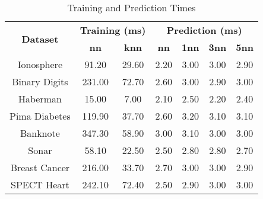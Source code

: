 \begin{table}[htbp]
\caption{Training and Prediction Times}
\begin{center}
\begin{tabular}{|c|c|c|c|c|c|c|}
\hline
\multirow{2}{*}{\textbf{Dataset}} & \multicolumn{2}{c|}{\textbf{Training (ms)}} & \multicolumn{4}{c|}{\textbf{Prediction (ms)}} \\ \cline{2-7}
 & \textbf{nn} & \textbf{knn} & \textbf{nn} & \textbf{1nn} & \textbf{3nn} & \textbf{5nn} \\ \hline
Ionosphere & 91.20 & 29.60 & 2.20 & 3.00 & 3.00 & 2.90 \\ \hline
Binary Digits & 231.00 & 72.70 & 2.60 & 3.00 & 2.90 & 3.00 \\ \hline
Haberman & 15.00 & 7.00 & 2.10 & 2.50 & 2.20 & 2.40 \\ \hline
Pima Diabetes & 119.90 & 37.70 & 2.60 & 3.20 & 3.10 & 3.10 \\ \hline
Banknote & 347.30 & 58.90 & 3.00 & 3.10 & 3.00 & 3.00 \\ \hline
Sonar & 58.10 & 22.50 & 2.50 & 2.80 & 2.80 & 2.70 \\ \hline
Breast Cancer & 216.00 & 33.70 & 2.70 & 3.00 & 3.00 & 2.90 \\ \hline
SPECT Heart & 242.10 & 72.40 & 2.50 & 2.90 & 3.00 & 3.00 \\ \hline
\end{tabular}
\label{tab:timing}
\end{center}
\end{table}